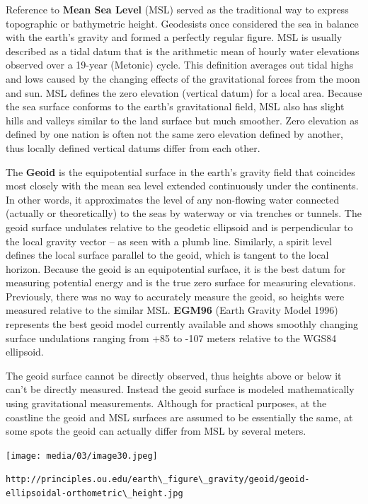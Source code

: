 \documentclass[
]{book}
\begin{document}
Reference to \textbf{Mean Sea Level} (MSL) served as the traditional way to express topographic or bathymetric height. Geodesists once considered the sea in balance with the earth's gravity and formed a perfectly regular figure. MSL is usually described as a tidal datum that is the arithmetic mean of hourly water elevations observed over a 19-year (Metonic) cycle. This definition averages out tidal highs and lows caused by the changing effects of the gravitational forces from the moon and sun. MSL defines the zero elevation (vertical datum) for a local area. Because the sea surface conforms to the earth's gravitational field, MSL also has slight hills and valleys similar to the land surface but much smoother. Zero elevation as defined by one nation is often not the same zero elevation defined by another, thus locally defined vertical datums differ from each other.

The \textbf{Geoid} is the equipotential surface in the earth's gravity field that coincides most closely with the mean sea level extended continuously under the continents. In other words, it approximates the level of any non-flowing water connected (actually or theoretically) to the seas by waterway or via trenches or tunnels. The geoid surface undulates relative to the geodetic ellipsoid and is perpendicular to the local gravity vector -- as seen with a plumb line. Similarly, a spirit level defines the local surface parallel to the geoid, which is tangent to the local horizon. Because the geoid is an equipotential surface, it is the best datum for measuring potential energy and is the true zero surface for measuring elevations. Previously, there was no way to accurately measure the geoid, so heights were measured relative to the similar MSL. \textbf{EGM96} (Earth Gravity Model 1996) represents the best geoid model currently available and shows smoothly changing surface undulations ranging from +85 to -107 meters relative to the WGS84 ellipsoid.

The geoid surface cannot be directly observed, thus heights above or below it can't be directly measured. Instead the geoid surface is modeled mathematically using gravitational measurements. Although for practical purposes, at the coastline the geoid and MSL surfaces are assumed to be essentially the same, at some spots the geoid can actually differ from MSL by several meters.

\texttt{[image: media/03/image30.jpeg]}

\texttt{http://principles.ou.edu/earth\textbackslash{}\_figure\textbackslash{}\_gravity/geoid/geoid-ellipsoidal-orthometric\textbackslash{}\_height.jpg}
\end{document}
